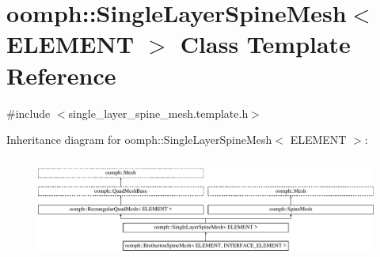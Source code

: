 \hypertarget{classoomph_1_1SingleLayerSpineMesh}{}\section{oomph\+:\+:Single\+Layer\+Spine\+Mesh$<$ E\+L\+E\+M\+E\+NT $>$ Class Template Reference}
\label{classoomph_1_1SingleLayerSpineMesh}


{\ttfamily \#include $<$single\+\_\+layer\+\_\+spine\+\_\+mesh.\+template.\+h$>$}

Inheritance diagram for oomph\+:\+:Single\+Layer\+Spine\+Mesh$<$ E\+L\+E\+M\+E\+NT $>$\+:\begin{figure}[H]
\begin{center}
\leavevmode
\includegraphics[height=3.414634cm]{classoomph_1_1SingleLayerSpineMesh}
\end{center}
\end{figure}
